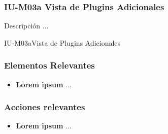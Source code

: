 
\subsubsection{IU-M03a Vista de Plugins Adicionales}

 Descripción ...

        {IU-M03a}{Vista de Plugins Adicionales}

\subsubsection{Elementos Relevantes}

    \begin{itemize}
    \item {\bf Lorem ipsum}
        ...
    \end{itemize}

\subsubsection{Acciones relevantes}

    \begin{itemize}
    \item {\bf Lorem ipsum}
        ...
    \end{itemize}

\clearpage
